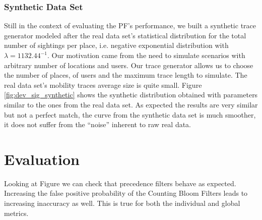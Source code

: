 \subsubsection{Synthetic Data Set}
\label{sec:simulator}
Still in the context of evaluating the PF's performance, we built a
synthetic trace generator modeled after the real data set's
statistical distribution for the total number of sightings per place,
i.e. negative exponential distribution with $\lambda =
1132.44^{-1}$. Our motivation came from the need to simulate scenarios
with arbitrary number of locations and users. Our trace generator
allows us to choose the number of places, of users and the maximum
trace length to simulate. The real data set's mobility traces average
size is quite small. Figure \ref{fig:dev_sig_synthetic} shows the
synthetic distribution obtained with parameters similar to the ones
from the real data set. As expected the results are very similar but not a
perfect match, the curve from the synthetic data set is much smoother,
it does not suffer from the ``noise'' inherent to raw real data.


\section{Evaluation}
\label{sec:ct-evaluation}

Looking at Figure  we can check that
precedence filters behave as expected. Increasing the false positive
probability of the Counting Bloom Filters leads to increasing
inaccuracy as well. This is true for both the individual and 
global metrics. 

